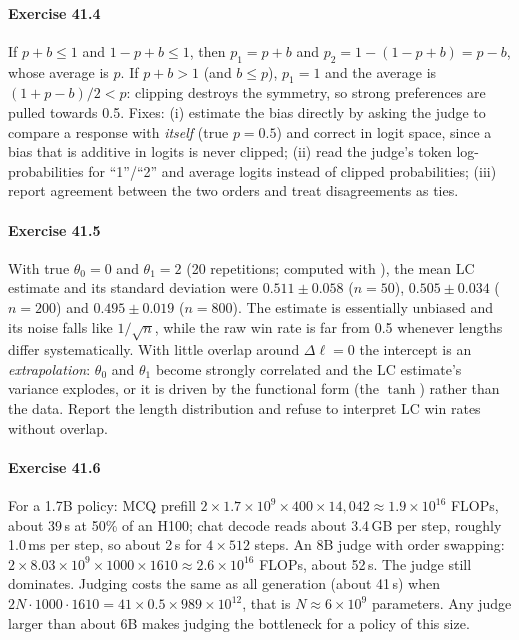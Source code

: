 \paragraph{Exercise 41.4} If $p+b\le1$ and $1-p+b\le1$, then $p_1=p+b$ and $p_2=1-(1-p+b)=p-b$, whose average is
$p$. If $p+b>1$ (and $b\le p$), $p_1=1$ and the average is $(1+p-b)/2<p$: clipping destroys the
symmetry, so strong preferences are pulled towards 0.5. Fixes: (i) estimate the bias directly by
asking the judge to compare a response with \emph{itself} (true $p=0.5$) and correct in logit space,
since a bias that is additive in logits is never clipped; (ii) read the judge's token log-probabilities
for ``1''/``2'' and average logits instead of clipped probabilities; (iii) report agreement between the
two orders and treat disagreements as ties.

\paragraph{Exercise 41.5} With true $\theta_0=0$ and $\theta_1=2$ (20 repetitions; computed with
), the mean LC estimate and its standard deviation were
$0.511\pm0.058$ ($n=50$), $0.505\pm0.034$ ($n=200$) and $0.495\pm0.019$ ($n=800$). The estimate is
essentially unbiased and its noise falls like $1/\sqrt n$, while the raw win rate is far from 0.5
whenever lengths differ systematically. With little overlap around $\Delta\ell=0$ the intercept is
an \emph{extrapolation}: $\theta_0$ and $\theta_1$ become strongly correlated and the LC estimate's
variance explodes, or it is driven by the functional form (the $\tanh$) rather than the data. Report
the length distribution and refuse to interpret LC win rates without overlap.

\paragraph{Exercise 41.6} For a 1.7B policy: MCQ prefill $2\times1.7\times10^9\times400\times14{,}042\approx1.9\times10^{16}$
FLOPs, about 39\,s at 50\% of an H100; chat decode reads about 3.4\,GB per step, roughly 1.0\,ms per step, so about
2\,s for $4\times512$ steps. An 8B judge with order swapping: $2\times8.03\times10^9\times1000\times1610\approx2.6\times10^{16}$ FLOPs,
about 52\,s. The judge still dominates. Judging costs the same as all generation (about 41\,s) when
$2N\cdot1000\cdot1610=41\times0.5\times989\times10^{12}$, that is $N\approx6\times10^9$ parameters. Any judge larger than
about 6B makes judging the bottleneck for a policy of this size.

